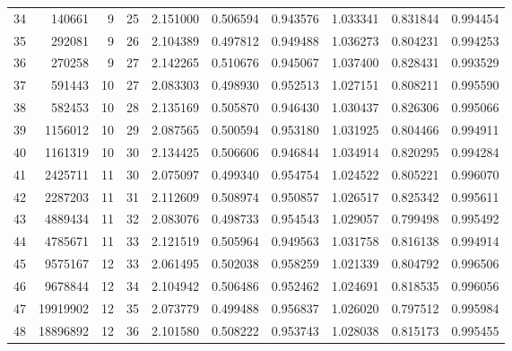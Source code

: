 \documentclass[12pt]{amsart}
\begin{document}
\begin{table}
{\begin{tabular}{|r|rrrrrrrrr|}
\\
 34 &140661 
& 9
& 25
&  2.151000 & 0.506594 &0.943576	
& 1.033341 & 0.831844 &0.994454	


\\
 35 &292081 
& 9
& 26
&  2.104389 & 0.497812 &0.949488	
& 1.036273 & 0.804231 &0.994253	


\\
 36 &270258 
& 9
& 27
&  2.142265 & 0.510676 &0.945067	
& 1.037400 & 0.828431 &0.993529	


\\
 37 &591443 
& 10
& 27
&  2.083303 & 0.498930 &0.952513	
& 1.027151 & 0.808211 &0.995590	


\\
 38 &582453 
& 10
& 28
&  2.135169 & 0.505870 &0.946430	
& 1.030437 & 0.826306 &0.995066	


\\
 39 &1156012 
& 10
& 29
&  2.087565 & 0.500594 &0.953180	
& 1.031925 & 0.804466 &0.994911	


\\
 40 &1161319 
& 10
& 30
&  2.134425 & 0.506606 &0.946844	
& 1.034914 & 0.820295 &0.994284	


\\
 41 &2425711 
& 11
& 30
&  2.075097 & 0.499340 &0.954754	
& 1.024522 & 0.805221 &0.996070	


\\
 42 &2287203 
& 11
& 31
&  2.112609 & 0.508974 &0.950857	
& 1.026517 & 0.825342 &0.995611	


\\
 43 &4889434 
& 11
& 32
&  2.083076 & 0.498733 &0.954543	
& 1.029057 & 0.799498 &0.995492	


\\
 44 &4785671 
& 11
& 33
&  2.121519 & 0.505964 &0.949563	
& 1.031758 & 0.816138 &0.994914	


\\
 45 &9575167 
& 12
& 33
&  2.061495 & 0.502038 &0.958259	
& 1.021339 & 0.804792 &0.996506	


\\
 46 &9678844 
& 12
& 34
&  2.104942 & 0.506486 &0.952462	
& 1.024691 & 0.818535 &0.996056	


\\
 47 &19919902 
& 12
& 35
&  2.073779 & 0.499488 &0.956837	
& 1.026020 & 0.797512 &0.995984	


\\
 48 &18896892 
& 12
& 36
&  2.101580 & 0.508222 &0.953743	
& 1.028038 & 0.815173 &0.995455	



\end{tabular}}
\end{table}
\end{document}
